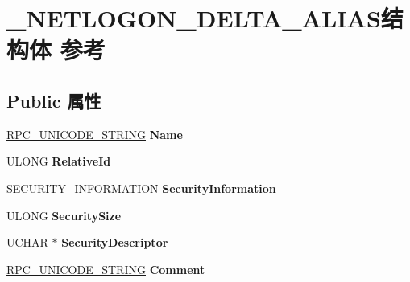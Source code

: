 \hypertarget{struct___n_e_t_l_o_g_o_n___d_e_l_t_a___a_l_i_a_s}{}\section{\+\_\+\+N\+E\+T\+L\+O\+G\+O\+N\+\_\+\+D\+E\+L\+T\+A\+\_\+\+A\+L\+I\+A\+S结构体 参考}
\label{struct___n_e_t_l_o_g_o_n___d_e_l_t_a___a_l_i_a_s}
\subsection*{Public 属性}
\begin{DoxyCompactItemize}
\item 
\mbox{\label{struct___n_e_t_l_o_g_o_n___d_e_l_t_a___a_l_i_a_s_a8879e952cac11c5150cfdc1a45971f3f}} 
\hyperlink{struct___r_p_c___u_n_i_c_o_d_e___s_t_r_i_n_g}{R\+P\+C\+\_\+\+U\+N\+I\+C\+O\+D\+E\+\_\+\+S\+T\+R\+I\+NG} {\bfseries Name}
\item 
\mbox{\label{struct___n_e_t_l_o_g_o_n___d_e_l_t_a___a_l_i_a_s_a51f810fe4de574556ca94516d901cbc2}} 
U\+L\+O\+NG {\bfseries Relative\+Id}
\item 
\mbox{\label{struct___n_e_t_l_o_g_o_n___d_e_l_t_a___a_l_i_a_s_aee495216b983a320df65ad2c01981eb8}} 
S\+E\+C\+U\+R\+I\+T\+Y\+\_\+\+I\+N\+F\+O\+R\+M\+A\+T\+I\+ON {\bfseries Security\+Information}
\item 
\mbox{\label{struct___n_e_t_l_o_g_o_n___d_e_l_t_a___a_l_i_a_s_ad49fa530733cbc65d1fc36c5323a2521}} 
U\+L\+O\+NG {\bfseries Security\+Size}
\item 
\mbox{\label{struct___n_e_t_l_o_g_o_n___d_e_l_t_a___a_l_i_a_s_abde5877d5900b5f900d18c2649e2701f}} 
U\+C\+H\+AR $\ast$ {\bfseries Security\+Descriptor}
\item 
\mbox{\label{struct___n_e_t_l_o_g_o_n___d_e_l_t_a___a_l_i_a_s_aa7a346d5684e9cf82b2173aa699bb95c}} 
\hyperlink{struct___r_p_c___u_n_i_c_o_d_e___s_t_r_i_n_g}{R\+P\+C\+\_\+\+U\+N\+I\+C\+O\+D\+E\+\_\+\+S\+T\+R\+I\+NG} {\bfseries Comment}

\end{DoxyCompactItemize}
